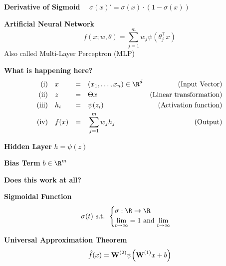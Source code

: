 {\footnotesize
    \remark \textbf{Derivative of Sigmoid} $\quad \sigma(x)' = \sigma(x)\cdot (1-\sigma(x))$
}

\newpage

 \textbf{Artificial Neural Network}\\
$$
    f(x;w,\theta) = \sum_{j=1}^{m}w_j\psi(\theta_j^\top x)
$$
{\scriptsize
    \remark Also called Multi-Layer Perceptron (MLP)
}

\textbf{What is happening here?}\\
\begin{align*}
    \text{(i)}      &\quad x       &=\quad& (x_1,\ldots,x_n) \in \R^d       & \text{(Input Vector)}             \\
    \text{(ii)}     &\quad z       &=\quad& \Theta x                        & \text{(Linear transformation)}    \\
    \text{(iii)}    &\quad h_i     &=\quad& \psi(z_i)                       & \text{(Activation function)}      \\
    \text{(iv)}     &\quad f(x)    &=\quad& \sum_{j=1}^m w_j h_j            & \text{(Output)}
\end{align*}

 \textbf{Hidden Layer} $h = \psi(z)$

 \textbf{Bias Term} $b \in \R^m$\\

\textbf{Does this work at all?}\\

 \textbf{Sigmoidal Function}
$$
    \sigma(t) \text{ s.t. } \begin{cases}
        \sigma: \R \to \R \\
        \underset{t\to\infty}{\lim} = 1 \text{ and } \underset{t\to\infty}{\lim}
    \end{cases}
$$

\theorem \textbf{Universal Approximation Theorem}\\
$$
    \hat{f}(x) = \textbf{W}^{(2)}\psi\Bigl( \textbf{W}^{(1)}x + b \Bigr)
$$ 
\\

